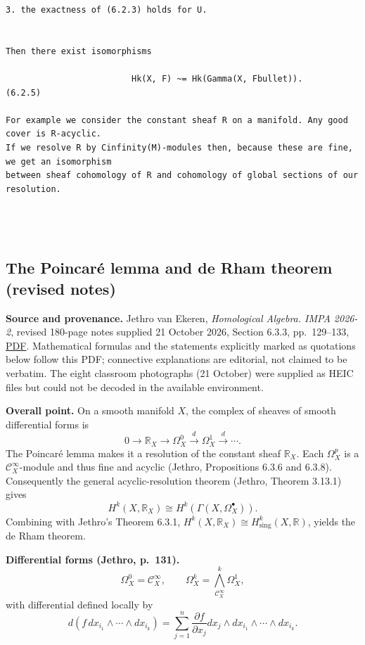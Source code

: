 \begin{Verbatim}[fontsize=\footnotesize]
   3. the exactness of (6.2.3) holds for U.


Then there exist isomorphisms

                         Hk(X, F) ~= Hk(Gamma(X, Fbullet)).                            (6.2.5)

For example we consider the constant sheaf R on a manifold. Any good cover is R-acyclic.
If we resolve R by Cinfinity(M)-modules then, because these are fine, we get an isomorphism
between sheaf cohomology of R and cohomology of global sections of our resolution.




\end{Verbatim}

\subsection{The Poincar\'e lemma and de Rham theorem (revised notes)}
\label{subsection-jethro-cech-5}

\noindent
{\bf Source and provenance.} Jethro van Ekeren,
\emph{Homological Algebra. IMPA 2026-2}, revised
180-page notes supplied 21 October 2026,
Section 6.3.3, pp.~129--133,
\href{https://w3.impa.br/~jethro/2026-2/ah-current.pdf}{PDF}.
Mathematical formulas and the statements explicitly marked
as quotations below follow this PDF; connective explanations
are editorial, not claimed to be verbatim. The eight classroom
photographs (21 October) were supplied as HEIC files but could
not be decoded in the available environment.

\medskip\noindent
{\bf Overall point.} On a smooth manifold $X$, the complex
of sheaves of smooth differential forms is
\[0\longrightarrow\mathbb R_X\longrightarrow\Omega_X^0
\xrightarrow{d}\Omega_X^1\xrightarrow{d}\cdots.\]
The Poincar\'e lemma makes it a resolution of the
constant sheaf $\mathbb R_X$. Each $\Omega_X^p$ is a
$\mathcal C_X^\infty$-module and thus fine and acyclic
(Jethro, Propositions 6.3.6 and 6.3.8).
Consequently the general acyclic-resolution theorem
(Jethro, Theorem 3.13.1) gives
\[H^k(X,\mathbb R_X)\cong H^k(\Gamma(X,\Omega_X^\bullet)).\]
Combining with Jethro's Theorem 6.3.1,
$H^k(X,\mathbb R_X)\cong H^k_{\mathrm{sing}}(X,\mathbb R)$,
yields the de Rham theorem.

\medskip\noindent
{\bf Differential forms (Jethro, p.~131).}
\[\Omega_X^0=\mathcal C_X^\infty,\qquad
\Omega_X^k=\bigwedge^k_{\mathcal C_X^\infty}\Omega_X^1,\]
with differential defined locally by
\[d(f\,dx_{i_1}\wedge\cdots\wedge dx_{i_k})
=\sum_{j=1}^n\frac{\partial f}{\partial x_j}
dx_j\wedge dx_{i_1}\wedge\cdots\wedge dx_{i_k}.\]

